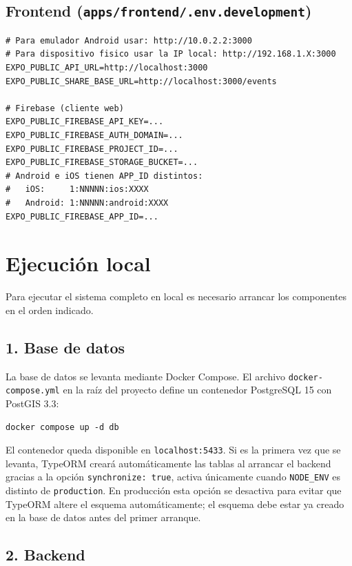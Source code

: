\subsection{Frontend (\texttt{apps/frontend/.env.development})}

\begin{lstlisting}
# Para emulador Android usar: http://10.0.2.2:3000
# Para dispositivo fisico usar la IP local: http://192.168.1.X:3000
EXPO_PUBLIC_API_URL=http://localhost:3000
EXPO_PUBLIC_SHARE_BASE_URL=http://localhost:3000/events

# Firebase (cliente web)
EXPO_PUBLIC_FIREBASE_API_KEY=...
EXPO_PUBLIC_FIREBASE_AUTH_DOMAIN=...
EXPO_PUBLIC_FIREBASE_PROJECT_ID=...
EXPO_PUBLIC_FIREBASE_STORAGE_BUCKET=...
# Android e iOS tienen APP_ID distintos:
#   iOS:     1:NNNNN:ios:XXXX
#   Android: 1:NNNNN:android:XXXX
EXPO_PUBLIC_FIREBASE_APP_ID=...
\end{lstlisting}

\section{Ejecución local}

Para ejecutar el sistema completo en local es necesario arrancar los componentes en el orden indicado.

\subsection{1. Base de datos}

La base de datos se levanta mediante Docker Compose. El archivo \texttt{docker-compose.yml} en la raíz del proyecto define un contenedor PostgreSQL 15 con PostGIS 3.3:

\begin{lstlisting}
docker compose up -d db
\end{lstlisting}

El contenedor queda disponible en \texttt{localhost:5433}. Si es la primera vez que se levanta, TypeORM creará automáticamente las tablas al arrancar el backend gracias a la opción \texttt{synchronize: true}, activa únicamente cuando \texttt{NODE\_ENV} es distinto de \texttt{production}. En producción esta opción se desactiva para evitar que TypeORM altere el esquema automáticamente; el esquema debe estar ya creado en la base de datos antes del primer arranque.

\subsection{2. Backend}

